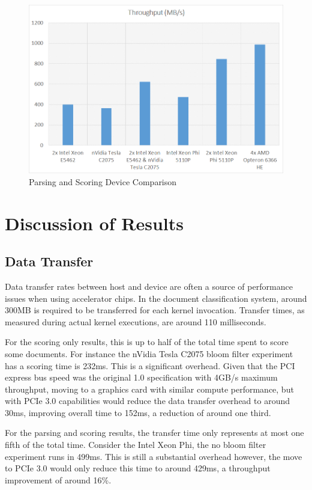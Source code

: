 \begin{figure}[H]
\centering
\includegraphics[width=\linewidth]{images/parsingScoringBest.png}
\caption{Parsing and Scoring Device Comparison}
\label{fig:parseScoringBest}
\end{figure}

\section{Discussion of Results}

\subsection{Data Transfer}

Data transfer rates between host and device are often a source of performance
issues when using accelerator chips. In the document classification system,
around 300MB is required to be transferred for each kernel invocation. Transfer
times, as measured during actual kernel executions, are around 110 milliseconds.

For the scoring only results, this is up to half of the total time spent to
score some documents. For instance the nVidia Tesla C2075 bloom filter
experiment has a scoring time is 232ms. This is a significant overhead. Given
that the PCI express bus speed was the original 1.0 specification with 4GB/s
maximum throughput, moving to a graphics card with similar compute performance,
but with PCIe 3.0 capabilities would reduce the data transfer overhead to
around 30ms, improving overall time to 152ms, a reduction of around one third.

For the parsing and scoring results, the transfer time only represents at most
one fifth of the total time. Consider the Intel Xeon Phi, the no bloom filter
experiment runs in 499ms. This is still a substantial overhead however, the move
to PCIe 3.0 would only reduce this time to around 429ms, a throughput
improvement of around 16\%.

